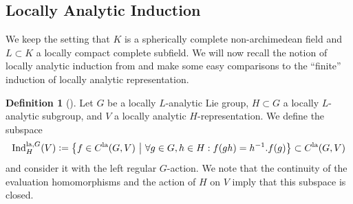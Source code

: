 \documentclass[a4paper, reqno, 10pt]{amsart}
\theoremstyle{definition}
\newtheorem{definition}[theorem]{Definition}
\numberwithin{equation}{section}
\newcommand{\defeq}{\vcentcolon=}
\newcommand{\Ind}{{\mathrm{Ind}}}
\newcommand{\la}{{\mathrm{la}}}
\let\originalmiddle\middle
\renewcommand{\middle}[1]{\,\originalmiddle#1\,}
\begin{document}
\subsection{Locally Analytic Induction}


We keep the setting that $K$ is a spherically complete non-archimedean field and $L\subset K$ a locally compact complete subfield.
We will now recall the notion of locally analytic induction from \cite[Kap.\ 4]{FeauxdeLacroix99TopDarstpAdischLieGrp} and make some easy comparisons to the ``finite'' induction of locally analytic representation.




\begin{definition}[{\cite[\S 4.1]{FeauxdeLacroix99TopDarstpAdischLieGrp}}]\label{Def 1 - Definition of locally analytic induction}
	Let $G$ be a locally $L$-analytic Lie group, $H\subset G$ a locally $L$-analytic subgroup, and $V$ a locally analytic $H$-representation.
	We define the subspace
	\begin{equation*}
		\Ind^{\la,G}_H (V) \defeq \left\{ f \in C^\la(G,V) \middle{|} \forall g\in G, h \in H: f(gh)= h^{-1}.f(g) \right\} \subset C^\la(G,V)
	\end{equation*}
	and consider it with the left regular $G$-action.
	We note that the continuity of the evaluation homomorphisms and the action of $H$ on $V$ imply that this subspace is closed.
\end{definition}
\end{document}
